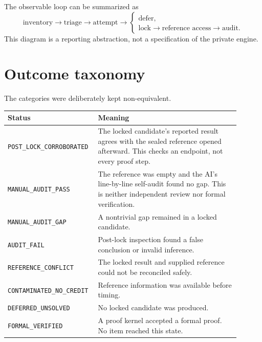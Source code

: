 \documentclass[10pt]{article}
\newcommand{\status}[1]{\texttt{#1}}
\begin{document}
The observable loop can be summarized as
\[
\text{inventory}\to\text{triage}\to\text{attempt}\to
\begin{cases}
\text{defer},\\
\text{lock}\to\text{reference access}\to\text{audit}.
\end{cases}
\]
This diagram is a reporting abstraction, not a specification of the private engine.

\section{Outcome taxonomy}
The categories were deliberately kept non-equivalent.

\begin{center}\small
\begin{tabular}{p{0.31\linewidth}p{0.59\linewidth}}
\toprule
Status & Meaning\\\midrule
\status{POST\_LOCK\_CORROBORATED} & The locked candidate's reported result agrees with the sealed reference opened afterward. This checks an endpoint, not every proof step.\\
\status{MANUAL\_AUDIT\_PASS} & The reference was empty and the AI's line-by-line self-audit found no gap. This is neither independent review nor formal verification.\\
\status{MANUAL\_AUDIT\_GAP} & A nontrivial gap remained in a locked candidate.\\
\status{AUDIT\_FAIL} & Post-lock inspection found a false conclusion or invalid inference.\\
\status{REFERENCE\_CONFLICT} & The locked result and supplied reference could not be reconciled safely.\\
\status{CONTAMINATED\_NO\_CREDIT} & Reference information was available before timing.\\
\status{DEFERRED\_UNSOLVED} & No locked candidate was produced.\\
\status{FORMAL\_VERIFIED} & A proof kernel accepted a formal proof. No item reached this state.\\
\bottomrule
\end{tabular}
\end{center}
\end{document}
